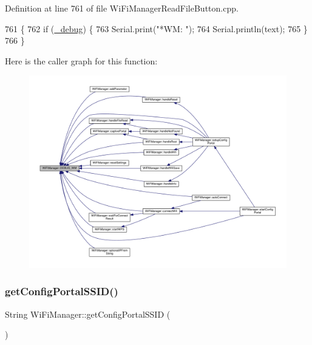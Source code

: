 Definition at line 761 of file Wi\+Fi\+Manager\+Read\+File\+Button.\+cpp.


\begin{DoxyCode}
761                                        \{
762   \textcolor{keywordflow}{if} (\hyperlink{class_wi_fi_manager_ac0f345f4a4c8bc38a49c8f87931b8cd4}{\_debug}) \{
763     Serial.print(\textcolor{stringliteral}{"*WM: "});
764     Serial.println(text);
765   \}
766 \}
\end{DoxyCode}
Here is the caller graph for this function\+:\nopagebreak
\begin{figure}[H]
\begin{center}
\leavevmode
\includegraphics[width=350pt]{d4/dc8/class_wi_fi_manager_ae5f595c670ccbcf9a191baf50f5c7c26_icgraph}
\end{center}
\end{figure}
\mbox{\label{class_wi_fi_manager_a157dc79b810f8f8d338a6120b13f5c94}} 
\subsubsection{\texorpdfstring{get\+Config\+Portal\+S\+S\+I\+D()}{getConfigPortalSSID()}}
{\footnotesize\ttfamily String Wi\+Fi\+Manager\+::get\+Config\+Portal\+S\+S\+ID (\begin{DoxyParamCaption}{ }\end{DoxyParamCaption})}



